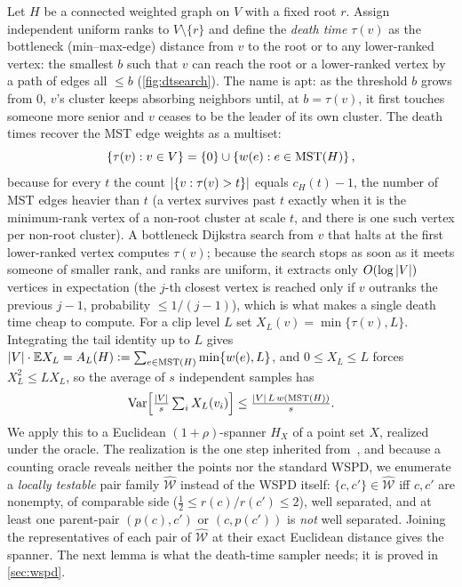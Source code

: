 Let $H$ be a connected weighted graph on $V$ with a fixed root $r$. Assign independent uniform ranks to
$V\setminus\{r\}$ and define the \emph{death time} $\tau(v)$ as the bottleneck (min--max-edge) distance
from $v$ to the root or to any lower-ranked vertex: the smallest $b$ such that $v$ can reach the root or a
lower-ranked vertex by a path of edges all $\le b$ (\cref{fig:dtsearch}). The name is apt: as the threshold $b$ grows from $0$,
$v$'s cluster keeps absorbing neighbors until, at $b=\tau(v)$, it first touches someone more senior and
$v$ ceases to be the leader of its own cluster. The death times recover the MST edge weights as a
multiset:
\begin{equation}\label{eq:death-multiset}
  \left\{\tau(v):v\in V\right\}=\left\{0\right\}\cup\left\{w(e):e\in\mathrm{MST}(H)\right\},
\end{equation}
because for every $t$ the count $\left|\{v:\tau(v)>t\}\right|$ equals $c_H(t)-1$, the number of MST edges heavier
than $t$ (a vertex survives past $t$ exactly when it is the minimum-rank vertex of a non-root cluster at
scale $t$, and there is one such vertex per non-root cluster). A bottleneck Dijkstra search from $v$ that
halts at the first lower-ranked vertex computes $\tau(v)$; because the search stops as soon as it meets
someone of smaller rank, and ranks are uniform, it extracts only $O(\log\left|V\right|)$ vertices in expectation
(the $j$-th closest vertex is reached only if $v$ outranks the previous $j-1$, probability $\le 1/(j-1)$),
which is what makes a single death time cheap to compute. For a clip level $L$ set
$X_L(v)=\min\{\tau(v),L\}$. Integrating the tail identity up to $L$ gives $\left|V\right|\cdot\mathbb{E}
X_L=A_L(H)\vcentcolon=\sum_{e\in\mathrm{MST}(H)}\min\{w(e),L\}$, and $0\le X_L\le L$ forces $X_L^2\le L X_L$, so the
average of $s$ independent samples has
\begin{equation}\label{eq:dt-var}
  \operatorname{Var}\Bigl[\tfrac{\left|V\right|}{s}\textstyle\sum_i X_L(v_i)\Bigr]\le\frac{\left|V\right|\,L\,w(\mathrm{MST}(H))}{s}.
\end{equation}
We apply this to a Euclidean $(1+\rho)$-spanner $H_X$ of a point set $X$, realized under the oracle. The
realization is the one step inherited from~\cite{DMOSW25}, and because a counting oracle reveals neither
the points nor the standard WSPD, we enumerate a \emph{locally testable} pair family $\widehat{\mathcal W}$
instead of the WSPD itself: $\{c,c'\}\in\widehat{\mathcal W}$ iff $c,c'$ are nonempty, of comparable side
($\tfrac12\le r(c)/r(c')\le2$), well separated, and at least one parent-pair $(p(c),c')$ or $(c,p(c'))$ is
\emph{not} well separated. Joining the representatives of each pair of $\widehat{\mathcal W}$ at their exact
Euclidean distance gives the spanner. The next lemma is what the death-time sampler needs; it is proved in
\cref{sec:wspd}.

